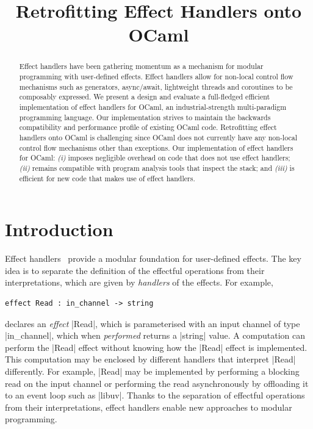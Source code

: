 \documentclass[sigplan,10pt,review,anonymous]{acmart}\settopmatter{printfolios=true,printccs=false,printacmref=false}
\begin{document}
\title{Retrofitting Effect Handlers onto OCaml}

\begin{abstract}
Effect handlers have been gathering momentum as a mechanism for modular
	programming with user-defined effects. Effect handlers allow for non-local
	control flow mechanisms such as generators, async/await, lightweight threads
	and coroutines to be composably expressed. We present a design and evaluate a
	full-fledged efficient implementation of effect handlers for OCaml, an
	industrial-strength multi-paradigm programming language. Our implementation
	strives to maintain the backwards compatibility and performance profile of
	existing OCaml code. Retrofitting effect handlers onto OCaml is challenging
	since OCaml does not currently have any non-local control flow mechanisms
	other than exceptions. Our implementation of effect handlers for OCaml: {\em
	(i)} imposes negligible overhead on code that does not use effect handlers;
	{\em (ii)} remains compatible with program analysis tools that inspect the
	stack; and {\em (iii)} is efficient for new code that makes use of effect
	handlers.
\end{abstract}

\maketitle

\section{Introduction}

Effect handlers~\cite{Plotkin09} provide a modular foundation for user-defined
effects. The key idea is to separate the definition of the effectful operations
from their interpretations, which are given by \emph{handlers} of the effects.
For example,
%
\begin{lstlisting}
effect Read : in_channel -> string
\end{lstlisting}
%
declares an \emph{effect} |Read|, which is parameterised with an input channel
of type |in_channel|, which when \emph{performed} returns a |string| value. A
computation can perform the |Read| effect without knowing how the |Read| effect
is implemented. This computation may be enclosed by different handlers that
interpret |Read| differently. For example, |Read| may be implemented by
performing a blocking read on the input channel or performing the read
asynchronously by offloading it to an event loop such as |libuv|. Thanks to the
separation of effectful operations from their interpretations, effect handlers
enable new approaches to modular programming.
\end{document}
